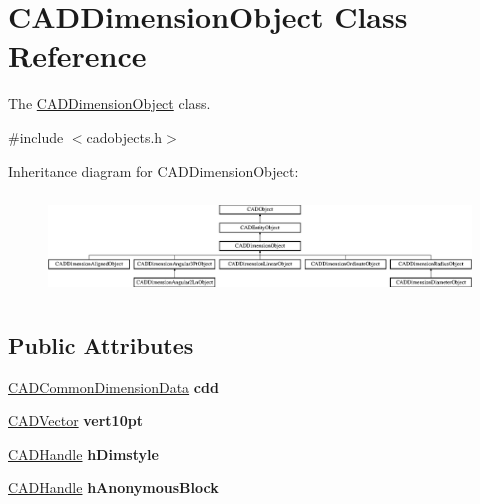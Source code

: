 \hypertarget{class_c_a_d_dimension_object}{}\section{C\+A\+D\+Dimension\+Object Class Reference}
\label{class_c_a_d_dimension_object}


The \hyperlink{class_c_a_d_dimension_object}{C\+A\+D\+Dimension\+Object} class.  




{\ttfamily \#include $<$cadobjects.\+h$>$}

Inheritance diagram for C\+A\+D\+Dimension\+Object\+:\begin{figure}[H]
\begin{center}
\leavevmode
\includegraphics[height=2.692308cm]{class_c_a_d_dimension_object}
\end{center}
\end{figure}
\subsection*{Public Attributes}
\begin{DoxyCompactItemize}
\item 
\hyperlink{struct__dimdata}{C\+A\+D\+Common\+Dimension\+Data} {\bfseries cdd}\hypertarget{class_c_a_d_dimension_object_a73ad5ed391445b6b0e18323927144e01}{}\label{class_c_a_d_dimension_object_a73ad5ed391445b6b0e18323927144e01}

\item 
\hyperlink{class_c_a_d_vector}{C\+A\+D\+Vector} {\bfseries vert10pt}\hypertarget{class_c_a_d_dimension_object_a900a32ed2795f3b61a1c5ecf26b68f24}{}\label{class_c_a_d_dimension_object_a900a32ed2795f3b61a1c5ecf26b68f24}

\item 
\hyperlink{class_c_a_d_handle}{C\+A\+D\+Handle} {\bfseries h\+Dimstyle}\hypertarget{class_c_a_d_dimension_object_a78613efb7a752bdb4168260893eceda9}{}\label{class_c_a_d_dimension_object_a78613efb7a752bdb4168260893eceda9}

\item 
\hyperlink{class_c_a_d_handle}{C\+A\+D\+Handle} {\bfseries h\+Anonymous\+Block}\hypertarget{class_c_a_d_dimension_object_a83cc9d355a3bb00a0773fc3ecd35a6ef}{}\label{class_c_a_d_dimension_object_a83cc9d355a3bb00a0773fc3ecd35a6ef}

\end{DoxyCompactItemize}

